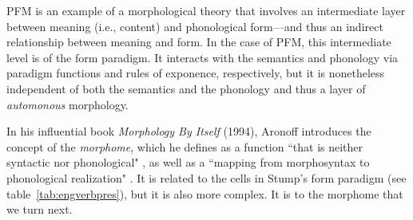\ac{PFM} is an example of a morphological theory that involves an intermediate layer between
meaning (i.e., content) and phonological form---and thus an indirect relationship between
meaning and form. In the case of \ac{PFM}, this intermediate
level is of the form paradigm. It interacts with the semantics and phonology 
via paradigm functions and rules of exponence, respectively,
but it is nonetheless independent of both the semantics and the phonology and thus a layer of \emph{automonous} morphology.  

In his influential book \textit{Morphology By Itself} (1994), Aronoff 
introduces the concept of the \emph{morphome}, which he
defines as a function ``that is neither 
syntactic nor phonological" \cite[][p. 25]{aronoff:1994}, %
as well as a
``mapping from morphosyntax to phonological realization" \citep[][p. 25]{aronoff:1994}. 
It is related
to the cells in Stump's form paradigm (see table~\ref{tab:engverbpres}), 
but it is also more complex. It is to the morphome that we turn next.


